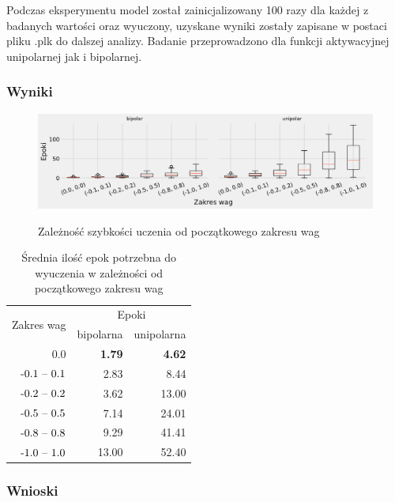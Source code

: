 \documentclass{article}
\begin{document}
Podczas eksperymentu model został zainicjalizowany 100 razy dla każdej z badanych wartości oraz wyuczony, uzyskane wyniki zostały zapisane w postaci pliku .plk do dalszej analizy. Badanie przeprowadzono dla funkcji aktywacyjnej unipolarnej jak i bipolarnej.

\subsubsection*{Wyniki}
\begin{figure}[!h]
	\centering
	\caption{Zależność szybkości uczenia od początkowego zakresu wag}
	\includegraphics[width=\textwidth]{per_w.png}
	\label{fig:res2}
\end{figure}

\begin{table}[!h]
	\caption{Średnia ilość epok potrzebna do wyuczenia w zależności od początkowego zakresu wag}
	\label{tabela-res-2}
	\centering
	\begin{tabular}{rrr}
		\toprule
		\multirow{2}{*}{Zakres wag}   & \multicolumn{2}{c}{Epoki} \\
		                  & bipolarna     & unipolarna    \\
		\midrule
		0.0               & \textbf{1.79} & \textbf{4.62} \\
		\($-0.1 -- 0.1$\) & 2.83          & 8.44          \\
		\($-0.2 -- 0.2$\) & 3.62          & 13.00         \\
		\($-0.5 -- 0.5$\) & 7.14          & 24.01         \\
		\($-0.8 -- 0.8$\) & 9.29          & 41.41         \\
		\($-1.0 -- 1.0$\) & 13.00         & 52.40         \\
		\bottomrule
	\end{tabular}
\end{table}

\subsubsection*{Wnioski}
\end{document}
